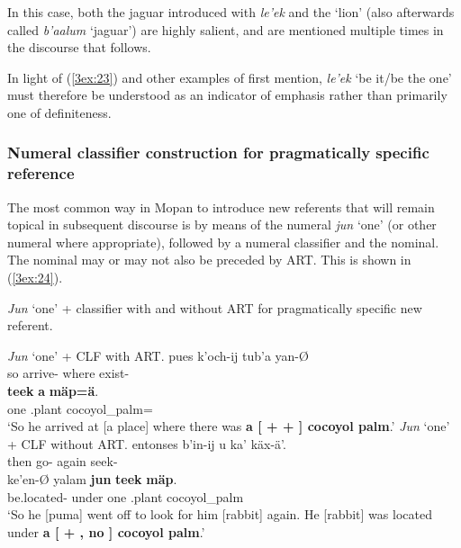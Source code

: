 \documentclass[output=paper]{langsci/langscibook}
\begin{document}
In this case, both the jaguar introduced with {\emph{le'ek}} and the `lion' (also afterwards called {\emph{b'aalum}} `jaguar') are highly salient, and are mentioned multiple times in the discourse that follows. 

In light of (\ref{3ex:23}) and other examples of first mention, {\emph{le'ek}} `be it/be the one' must therefore be understood as an indicator of emphasis rather than primarily one of definiteness.


\subsubsection{Numeral classifier construction for pragmatically specific reference}\label{3sec:334}

The most common way in Mopan to introduce new referents that will remain topical in subsequent discourse is by means of the numeral {\emph{jun}} `one' (or other numeral where appropriate), followed by a numeral classifier and the nominal.  The nominal may or may not also be preceded by ART.  This is shown in (\ref{3ex:24}).

\filbreak
\begin{exe}
\ex\label{3ex:24}
{\emph{Jun}} `one' + classifier with and without ART for pragmatically specific new referent.
	\begin{xlista}
	\ex\label{3ex:24a}
	{\emph{Jun}} `one' + CLF with ART.  
	\exi{}
	\gll	pues	k'och-ij				tub'a		yan-\O \\
		so	arrive-{}	where	exist-{} \\
	\glt
	\exi{}
		{\bf{teek}}		{\bf{a}}	{\bf{m\"ap=\"a}}. \\
		one		{}.plant	{}		cocoyol\_palm={} \\
	\glt	`So he arrived at [a place] where there was {\bf{a [{} + {} + {}] cocoyol palm}}.'
	\ex\label{3ex:24b}
	{\emph{Jun}} `one' + CLF without ART. 
	\exi{}
	\gll	entonses		b'in-ij				u		ka'		k\"ax-\"a'. \\
		then			go-{}	{}	again	seek-{} \\
	\glt
	\exi{}	
	\gll	ke'en-{\O}			yalam	{\bf{jun}}	{\bf{teek}}		{\bf{m\"ap}}.  \\
		be.located-{}	under	one		{}.plant	cocoyol\_palm \\
	\glt	`So he [puma] went off to look for him [rabbit] again. He [rabbit] was located under {\bf{a [{} + {}, no {}] cocoyol palm}}.'
	\end{xlista}
\end{exe}
\end{document}
